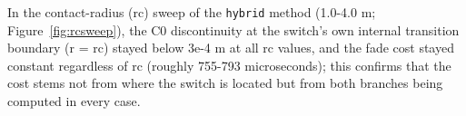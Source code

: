 In the contact-radius (rc) sweep of the \texttt{hybrid} method (1.0-4.0 m; Figure~\ref{fig:rcsweep}), the C0 discontinuity at the switch's own internal transition boundary (r = rc) stayed below 3e-4 m at all rc values, and the fade cost stayed constant regardless of rc (roughly 755-793 microseconds); this confirms that the cost stems not from where the switch is located but from both branches being computed in every case.
